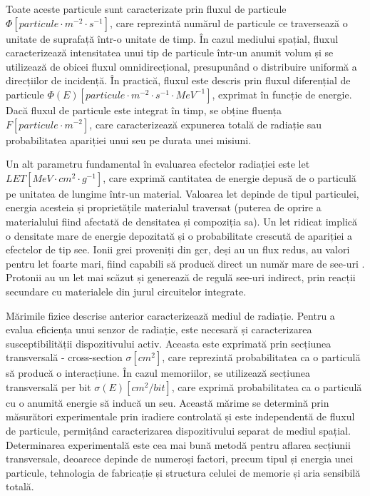 \documentclass[12pt,a4paper]{report}
\begin{document}
Toate aceste particule sunt caracterizate prin fluxul de particule \(\Phi [particule \cdot m^{-2} \cdot s^{-1}]\), care reprezintă numărul de particule ce traversează o unitate de suprafață într-o unitate de timp. În cazul mediului spațial, fluxul caracterizează intensitatea unui tip de particule într-un anumit volum și se utilizează de obicei fluxul omnidirecțional, presupunând o distribuire uniformă a direcțiilor de incidență. În practică, fluxul este descris prin fluxul diferențial de particule \(\Phi(E) [particule \cdot m^{-2} \cdot s^{-1} \cdot MeV^{-1}]\), exprimat în funcție de energie. Dacă fluxul de particule este integrat în timp, se obține fluența \(F [particule \cdot m^{-2}]\), care caracterizează expunerea totală de radiație sau probabilitatea apariției unui \gls{seu} pe durata unei misiuni.

Un alt parametru fundamental în evaluarea efectelor radiației este \gls{let} \( LET [MeV \cdot cm^2 \cdot g^{-1}]\), care exprimă cantitatea de energie depusă de o particulă pe unitatea de lungime într-un material. Valoarea \gls{let} depinde de tipul particulei, energia acesteia și proprietățile materialul traversat (puterea de oprire a materialului fiind afectată de densitatea și compoziția sa). Un \gls{let} ridicat implică o densitate mare de energie depozitată și o probabilitate crescută de apariției a efectelor de tip \gls{see}. Ionii grei proveniți din \gls{gcr}, deși au un flux redus, au valori pentru \gls{let} foarte mari, fiind capabili să producă direct un număr mare de \gls{see}-uri \cite{nasa_radiation_effects}. Protonii au un \gls{let} mai scăzut și generează de regulă \gls{see}-uri indirect, prin reacții secundare cu materialele din jurul circuitelor integrate.

Mărimile fizice descrise anterior caracterizează mediul de radiație. Pentru a evalua eficiența unui senzor de radiație, este necesară și caracterizarea susceptibilității dispozitivului activ. Aceasta este exprimată prin secțiunea transversală - cross-section \(\sigma [cm^2]\), care reprezintă probabilitatea ca o particulă să producă o interacțiune. În cazul memoriilor, se utilizează secțiunea transversală per bit \(\sigma(E) [cm^2 / bit]\), care exprimă probabilitatea ca o particulă cu o anumită energie să inducă un \gls{seu}. Această mărime se determină prin măsurători experimentale prin iradiere controlată și este independentă de fluxul de particule, permițând caracterizarea dispozitivului separat de mediul spațial. Determinarea experimentală este cea mai bună metodă pentru aflarea secțiunii transversale, deoarece depinde de numeroși factori, precum tipul și energia unei particule, tehnologia de fabricație și structura celulei de memorie și aria sensibilă totală.
\end{document}
